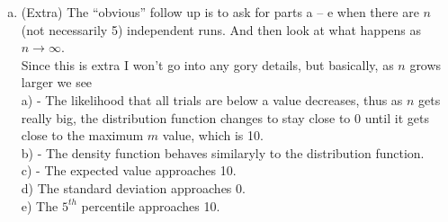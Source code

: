 \documentclass{scrartcl}
\begin{document}
\begin{enumerate}
\begin{enumerate}[a)]
\item (Extra) The “obvious” follow up is to ask for parts a – e when there are $n$ (not necessarily 5) independent runs. And then look at what happens as $n\rightarrow\infty$.\\

Since this is extra I won't go into any gory details, but basically, as $n$ grows larger we see\\

a) - The likelihood that all trials are below a value decreases, thus as $n$ gets really big, the distribution function changes to stay close to 0 until it gets close to the maximum $m$ value, which is 10.\\

b) - The density function behaves similaryly to the distribution function.\\

c) - The expected value approaches 10.\\

d) The standard deviation approaches 0.\\

e) The $5^{th}$ percentile approaches 10.
\end{enumerate}
\end{enumerate}
\end{document}
